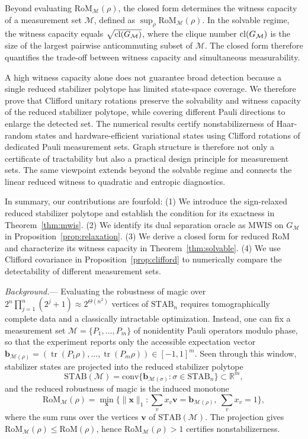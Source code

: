 \documentclass[10pt,aps,pra,twocolumn,floatfix,nofootinbib,superscriptaddress,longbibliography]{revtex4-2}
\newcommand{\R}{\mathbb R}
\newcommand{\Mcal}{\mathcal M}
\newcommand{\STAB}{\mathrm{STAB}}
\newcommand{\RoM}{\mathrm{RoM}}
\newcommand{\conv}{\mathrm{conv}}
\renewcommand{\tr}{\operatorname{tr}}
\providecommand{\mathbm}[1]{\bm{#1}}
\begin{document}
	Beyond evaluating $\RoM_\Mcal(\rho)$, the closed form determines the witness capacity of a measurement set $\Mcal$, defined as $\sup_\rho\RoM_\Mcal(\rho)$.
	In the solvable regime, the witness capacity equals $\sqrt{\clnum(G_\Mcal)}$, where the clique number $\clnum(G_\Mcal)$ is the size of the largest pairwise anticommuting subset of $\Mcal$.
	The closed form therefore quantifies the trade-off between witness capacity and simultaneous measurability.
	
	A high witness capacity alone does not guarantee broad detection because a single reduced stabilizer polytope has limited state-space coverage.
	We therefore prove that Clifford unitary rotations preserve the solvability and witness capacity of the reduced stabilizer polytope, while covering different Pauli directions to enlarge the detected set.
	The numerical results certify nonstabilizerness of Haar-random states and hardware-efficient variational states using Clifford rotations of dedicated Pauli measurement sets.
	Graph structure is therefore not only a certificate of tractability but also a practical design principle for measurement sets.
	The same viewpoint extends beyond the solvable regime and connects the linear reduced witness to quadratic and entropic diagnostics.
	
	In summary, our contributions are fourfold: (1) We introduce the sign-relaxed reduced stabilizer polytope and establish the condition for its exactness in Theorem~\ref{thm:mwis}. (2) We identify its dual separation oracle as MWIS on $G_\Mcal$ in Proposition~\ref{prop:relaxation}. (3) We derive a closed form for reduced RoM and characterize its witness capacity in Theorem~\ref{thm:solvable}. (4) We use Clifford covariance in Proposition~\ref{prop:clifford} to numerically compare the detectability of different measurement sets.
	
	\emph{Background.}---
	\label{sec:background}
	Evaluating the robustness of magic over $2^n\prod_{j=1}^{n}(2^j+1)\approx2^{\Theta(n^2)}$ vertices of $\STAB_n$ requires tomographically complete data and a classically intractable optimization.
	Instead, one can fix a measurement set $\Mcal=\{P_1,\dots,P_m\}$ of nonidentity Pauli operators modulo phase, so that the experiment reports only the accessible expectation vector $\mathbm{b}_{\Mcal(\rho)}=(\tr(P_1\rho),\dots,\tr(P_m\rho))\in[-1,1]^m$.
	Seen through this window, stabilizer states are projected into the reduced stabilizer polytope
	{\small
		\begin{equation}
			\STAB(\Mcal)=\conv\{\mathbm{b}_{\Mcal(\sigma)}:\sigma\in\STAB_n\}\subset\R^m,
			\label{eq:reduced-stab-polytope}
		\end{equation}
	}
	and the reduced robustness of magic is the induced monotone
	{\small
		\begin{equation}
			\RoM_\Mcal(\rho)
			=\min_{\mathbm{x}}\!\Big\{\|\mathbm{x}\|_1:\!\textstyle\sum_v x_v\mathbm{v}=\mathbm{b}_{\Mcal(\rho)},\ \textstyle\sum_v x_v=1\Big\},
			\label{eq:reduced-primal}
		\end{equation}
	}
	where the sum runs over the vertices $\mathbm{v}$ of $\STAB(\Mcal)$. 
	The projection gives $\RoM_\Mcal(\rho)\le\RoM(\rho)$, hence $\RoM_\Mcal(\rho)>1$ certifies nonstabilizerness.
	
\end{document}

